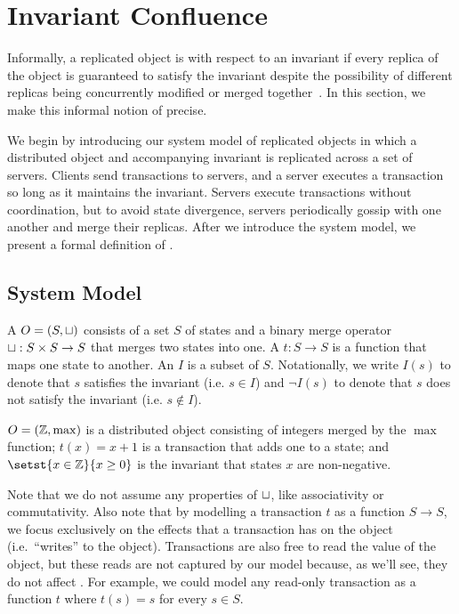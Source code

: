 \section{Invariant Confluence}
Informally, a replicated object is  with respect
to an invariant if every replica of the object is guaranteed to satisfy the
invariant despite the possibility of different replicas being concurrently
modified or merged together~\cite{bailis2014coordination}. In this section, we
make this informal notion of \invariantconfluence{} precise.

We begin by introducing our system model of replicated objects in which a
distributed object and accompanying invariant is replicated across a set of
servers. Clients send transactions to servers, and a server executes a
transaction so long as it maintains the invariant. Servers execute
transactions without coordination, but to avoid state divergence, servers
periodically gossip with one another and merge their replicas.
%
After we introduce the system model, we present a formal definition of
\invariantconfluence{}.

\subsection{System Model}

A  $O = (S, \sqcup)$ consists of a set $S$ of states
and a binary merge operator $\sqcup: S \times S \to S$ that merges two states
into one. A  $t: S \to S$ is a
function that maps one state to another. An  $I$ is a subset
of $S$. Notationally, we write $I(s)$ to denote that $s$ satisfies the
invariant (i.e. $s \in I$) and $\lnot I(s)$ to denote that $s$ does not satisfy
the invariant (i.e. $s \notin I$).

\begin{example}
  $O = (\mathbb{Z}, \max)$ is a distributed object consisting of integers merged by the
  $\max$ function; $t(x) = x + 1$ is a transaction that adds one to a state; and
  $\setst{x \in \ints}{x \geq 0}$ is the invariant that states $x$ are
  non-negative.
\end{example}

Note that we do not assume any properties of $\sqcup$, like associativity or
commutativity. Also note that by modelling a transaction $t$ as a function $S
\to S$, we focus exclusively on the effects that a transaction has on the
object (i.e.\ ``writes'' to the object). Transactions are also free to read the
value of the object, but these reads are not captured by our model because, as
we'll see, they do not affect \invariantconfluence{}. For example, we could
model any read-only transaction as a function $t$ where $t(s) = s$ for every $s
\in S$.

